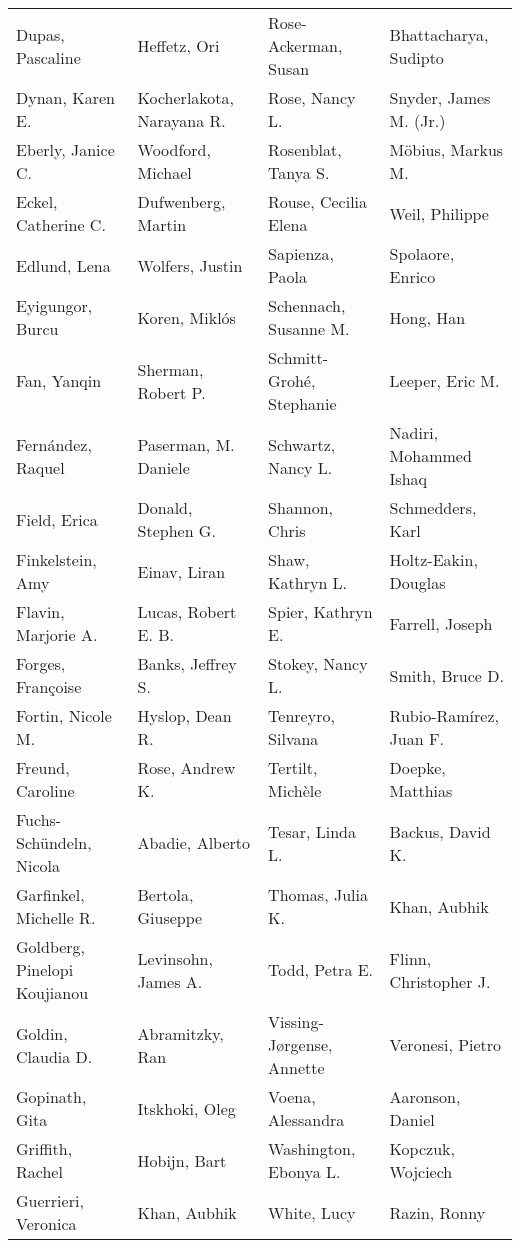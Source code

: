 \begin{ThreePartTable}
{\begin{longtable}[c]{llll}
            Dupas, Pascaline&Heffetz, Ori&Rose-Ackerman, Susan&Bhattacharya, Sudipto\\
            Dynan, Karen E.&Kocherlakota, Narayana R.&Rose, Nancy L.&Snyder, James M. (Jr.)\\
            Eberly, Janice C.&Woodford, Michael&Rosenblat, Tanya S.&Möbius, Markus M.\\
            Eckel, Catherine C.&Dufwenberg, Martin&Rouse, Cecilia Elena&Weil, Philippe\\
            Edlund, Lena&Wolfers, Justin&Sapienza, Paola&Spolaore, Enrico\\
            Eyigungor, Burcu&Koren, Miklós&Schennach, Susanne M.&Hong, Han\\
            Fan, Yanqin&Sherman, Robert P.&Schmitt-Grohé, Stephanie&Leeper, Eric M.\\
            Fernández, Raquel&Paserman, M. Daniele&Schwartz, Nancy L.&Nadiri, Mohammed Ishaq\\
            Field, Erica&Donald, Stephen G.&Shannon, Chris&Schmedders, Karl\\
            Finkelstein, Amy&Einav, Liran&Shaw, Kathryn L.&Holtz-Eakin, Douglas\\
            Flavin, Marjorie A.&Lucas, Robert E. B.&Spier, Kathryn E.&Farrell, Joseph\\
            Forges, Françoise&Banks, Jeffrey S.&Stokey, Nancy L.&Smith, Bruce D.\\
            Fortin, Nicole M.&Hyslop, Dean R.&Tenreyro, Silvana&Rubio-Ramírez, Juan F.\\
            Freund, Caroline&Rose, Andrew K.&Tertilt, Michèle&Doepke, Matthias\\
            Fuchs-Schündeln, Nicola&Abadie, Alberto&Tesar, Linda L.&Backus, David K.\\
            Garfinkel, Michelle R.&Bertola, Giuseppe&Thomas, Julia K.&Khan, Aubhik\\
            Goldberg, Pinelopi Koujianou&Levinsohn, James A.&Todd, Petra E.&Flinn, Christopher J.\\
            Goldin, Claudia D.&Abramitzky, Ran&Vissing-Jørgense, Annette&Veronesi, Pietro\\
            Gopinath, Gita&Itskhoki, Oleg&Voena, Alessandra&Aaronson, Daniel\\
            Griffith, Rachel&Hobijn, Bart&Washington, Ebonya L.&Kopczuk, Wojciech\\
            Guerrieri, Veronica&Khan, Aubhik&White, Lucy&Razin, Ronny\\

\end{longtable}}
\end{ThreePartTable}
